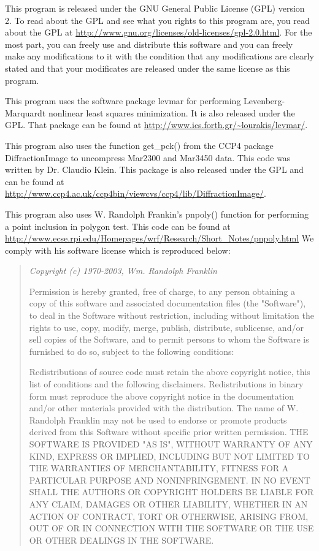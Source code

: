This program is released under the GNU General
Public License (GPL) version 2.
To read about
the GPL and see what you rights to this program are,
you read about the GPL at
\url{http://www.gnu.org/licenses/old-licenses/gpl-2.0.html}.
For the most part, you can freely use and distribute 
this software and you can freely make any modifications to 
it with the condition
that any modifications are clearly stated and that
your modificates are released under the same license as
this program.

This program uses the software package
levmar for performing Levenberg-Marquardt nonlinear
least squares minimization.
It is also released under
the GPL. That package can be found at 
\url{http://www.ics.forth.gr/~lourakis/levmar/}.\cite{lourakis04LM}

This program also uses the function get\_pck() from the CCP4 package
DiffractionImage to uncompress Mar2300 and Mar3450 data. This code was
written by Dr. Claudio Klein. This package is 
also released under the GPL and can be found at
\url{http://www.ccp4.ac.uk/ccp4bin/viewcvs/ccp4/lib/DiffractionImage/}\cite{Klein95}.


This program also uses W. Randolph Frankin's pnpoly() 
function for performing a point inclusion in polygon test. 
This code can be found at
\url{http://www.ecse.rpi.edu/Homepages/wrf/Research/Short\_Notes/pnpoly.html}
We comply with his software license which is reproduced below\cite{Franklin05}:
\begin{quotation}\em
Copyright (c) 1970-2003, Wm. Randolph Franklin

Permission is hereby granted, free of charge, to any person obtaining a copy of this software and associated documentation files (the "Software"), to deal in the Software without restriction, including without limitation the rights to use, copy, modify, merge, publish, distribute, sublicense, and/or sell copies of the Software, and to permit persons to whom the Software is furnished to do so, subject to the following conditions:

Redistributions of source code must retain the above copyright notice, this list of conditions and the following disclaimers.
Redistributions in binary form must reproduce the above copyright notice in the documentation and/or other materials provided with the distribution.
The name of W. Randolph Franklin may not be used to endorse or promote products derived from this Software without specific prior written permission.
THE SOFTWARE IS PROVIDED "AS IS", WITHOUT WARRANTY OF ANY KIND, EXPRESS OR IMPLIED, INCLUDING BUT NOT LIMITED TO THE WARRANTIES OF MERCHANTABILITY, FITNESS FOR A PARTICULAR PURPOSE AND NONINFRINGEMENT. IN NO EVENT SHALL THE AUTHORS OR COPYRIGHT HOLDERS BE LIABLE FOR ANY CLAIM, DAMAGES OR OTHER LIABILITY, WHETHER IN AN ACTION OF CONTRACT, TORT OR OTHERWISE, ARISING FROM, OUT OF OR IN CONNECTION WITH THE SOFTWARE OR THE USE OR OTHER DEALINGS IN THE SOFTWARE.
\end{quotation}

